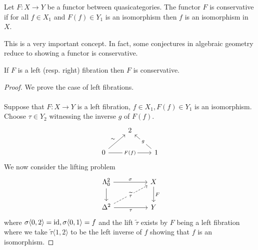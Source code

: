\begin{definition}\label{def: conservative functor}
    Let $F:X\to Y$ be a functor between quasicategories. The functor $F$ is conservative if for all $f\in X_{1}$ and $F(f)\in Y_{1}$ is an isomorphism then $f$ is an isomorphism in $X$. 
\end{definition}
\begin{remark}
    This is a very important concept. In fact, some conjectures in algebraic geometry reduce to showing a functor is conservative. 
\end{remark}
\begin{proposition}\label{prop: left and right fibrations are conservative}
    If $F$ is a left (resp. right) fibration then $F$ is conservative. 
\end{proposition}
\begin{proof}
    We prove the case of left fibrations. 
    \\\\
    Suppose that $F:X\to Y$ is a left fibration, $f\in X_{1}, F(f)\in Y_{1}$ is an isomorphism. Choose $\tau\in Y_{2}$ witnessing the inverse $g$ of $F(f)$. 
    $$%
    \begin{tikzcd}
        & 2 \\
        0 && 1
        \arrow["{F(f)}"{description}, from=2-1, to=2-3]
        \arrow["g"{description}, from=2-3, to=1-2]
        \arrow["\sim", from=2-1, to=1-2]
    \end{tikzcd}$$
    We now consider the lifting problem 
    $$%
    \begin{tikzcd}
        {\Lambda^{2}_{0}} && X \\
        {\Delta^{2}} && Y
        \arrow[from=1-1, to=2-1]
        \arrow["F", from=1-3, to=2-3]
        \arrow["\sigma", from=1-1, to=1-3]
        \arrow["\tau"', from=2-1, to=2-3]
        \arrow["{\widetilde{\tau}}"{description}, dashed, from=2-1, to=1-3]
    \end{tikzcd}$$
    where $\sigma\langle0,2\rangle=\mathrm{id}, \sigma\langle0,1\rangle=f$ and the lift $\widetilde{\tau}$ exists by $F$ being a left fibration where we take $\widetilde{\tau}\langle1,2\rangle$ to be the left inverse of $f$ showing that $f$ is an isomorphism. 
\end{proof}
